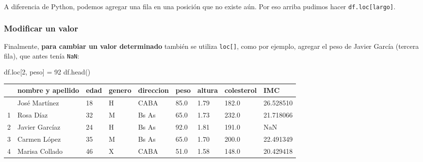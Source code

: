 \documentclass[
  letterpaper,
  DIV=11,
  numbers=noendperiod]{scrreprt}
\newenvironment{Shaded}{\begin{snugshade}}{\end{snugshade}}
\newcommand{\DecValTok}[1]{\textcolor[rgb]{0.68,0.00,0.00}{#1}}
\newcommand{\NormalTok}[1]{\textcolor[rgb]{0.00,0.23,0.31}{#1}}
\newcommand{\OperatorTok}[1]{\textcolor[rgb]{0.37,0.37,0.37}{#1}}
\newcommand{\StringTok}[1]{\textcolor[rgb]{0.13,0.47,0.30}{#1}}
\begin{document}
\begin{tcolorbox}[enhanced jigsaw, arc=.35mm, toptitle=1mm, colframe=quarto-callout-note-color-frame, bottomtitle=1mm, opacitybacktitle=0.6, colbacktitle=quarto-callout-note-color!10!white, leftrule=.75mm, coltitle=black, toprule=.15mm, titlerule=0mm, title=\textcolor{quarto-callout-note-color}{\faInfo}\hspace{0.5em}{¿Por qué usamos `len' arriba?}, bottomrule=.15mm, rightrule=.15mm, colback=white, breakable, opacityback=0, left=2mm]

A diferencia de Python, podemos agregar una fila en una posición que no
existe aún. Por eso arriba pudimos hacer \texttt{df.loc{[}largo{]}}.

\end{tcolorbox}

\subsubsection{Modificar un valor}\label{modificar-un-valor}

Finalmente, \textbf{para cambiar un valor determinado} también se
utiliza \texttt{loc{[}{]}}, como por ejemplo, agregar el peso de Javier
García (tercera fila), que antes tenía \texttt{NaN}:

\begin{Shaded}
\begin{Highlighting}[]
\NormalTok{df.loc[}\DecValTok{2}\NormalTok{, }\StringTok{\textquotesingle{}peso\textquotesingle{}}\NormalTok{] }\OperatorTok{=} \DecValTok{92}
\NormalTok{df.head()}
\end{Highlighting}
\end{Shaded}

\begin{longtable}[]{@{}lllllllll@{}}
\toprule\noalign{}
& nombre y apellido & edad & genero & direccion & peso & altura &
colesterol & IMC \\
\midrule\noalign{}
\endhead
\bottomrule\noalign{}
\endlastfoot
0 & José Martínez & 18 & H & CABA & 85.0 & 1.79 & 182.0 & 26.528510 \\
1 & Rosa Díaz & 32 & M & Bs As & 65.0 & 1.73 & 232.0 & 21.718066 \\
2 & Javier Garcíaz & 24 & H & Bs As & 92.0 & 1.81 & 191.0 & NaN \\
3 & Carmen López & 35 & M & Bs As & 65.0 & 1.70 & 200.0 & 22.491349 \\
4 & Marisa Collado & 46 & X & CABA & 51.0 & 1.58 & 148.0 & 20.429418 \\
\end{longtable}
\end{document}
